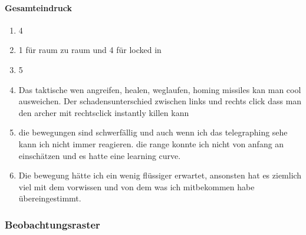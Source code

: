 \documentclass[../Main.tex]{subfiles}
\begin{document}
\paragraph{Gesamteindruck}
\begin{enumerate}[label=\textbf{Q\arabic*}, leftmargin=1.5cm, itemsep=0.8em, resume]
\item 4
\item 1 für raum zu raum und 4 für locked in
\item 5
\item Das taktische wen angreifen, healen, weglaufen, homing missiles kan man cool ausweichen. Der schadensunterschied zwischen links und rechts click dass man den archer mit rechtsclick instantly killen kann
\item die bewegungen sind schwerfällig und auch wenn ich das telegraphing sehe kann ich nicht immer reagieren. die range konnte ich nicht von anfang an einschätzen und es hatte eine learning curve.
\item Die bewegung hätte ich ein wenig flüssiger erwartet, ansonsten hat es ziemlich viel mit dem vorwissen und von dem was ich mitbekommen habe übereingestimmt.
\end{enumerate}

\subsubsection{Beobachtungsraster}
\end{document}
